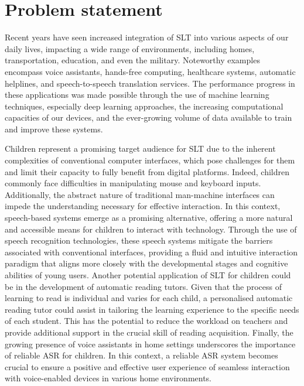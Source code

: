 \section{Problem statement}
Recent years have seen increased integration of \ac{SLT} into various aspects of our daily lives, impacting a wide range of environments, including homes, transportation, education, and even the military. Noteworthy examples encompass voice assistants, hands-free computing, healthcare systems, automatic helplines, and speech-to-speech translation services. The performance progress in these applications was made possible through the use of machine learning techniques, especially deep learning approaches, the increasing computational capacities of our devices, and the ever-growing volume of data available to train and improve these systems.

Children represent a promising target audience for \ac{SLT} due to the inherent complexities of conventional computer interfaces, which pose challenges for them and limit their capacity to fully benefit from digital platforms. Indeed, children commonly face difficulties in manipulating mouse and keyboard inputs. Additionally, the abstract nature of traditional man-machine interfaces can impede the understanding necessary for effective interaction. In this context, speech-based systems emerge as a promising alternative, offering a more natural and accessible means for children to interact with technology. Through the use of speech recognition technologies, these speech systems mitigate the barriers associated with conventional interfaces, providing a fluid and intuitive interaction paradigm that aligns more closely with the developmental stages and cognitive abilities of young users. Another potential application of \ac{SLT} for children could be in the development of automatic reading tutors. Given that the process of learning to read is individual and varies for each child, a personalised automatic reading tutor could assist in tailoring the learning experience to the specific needs of each student. This has the potential to reduce the workload on teachers and provide additional support in the crucial skill of reading acquisition. Finally, the growing presence of voice assistants in home settings underscores the importance of reliable \ac{ASR} for children. In this context, a reliable \ac{ASR} system becomes crucial to ensure a positive and effective user experience of seamless interaction with voice-enabled devices in various home environments.

